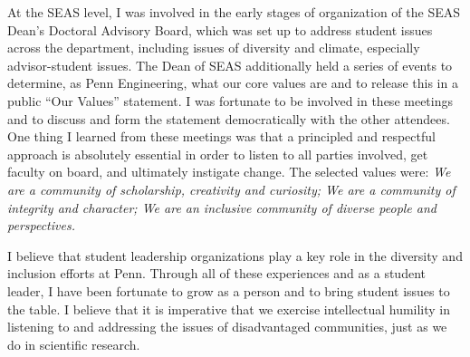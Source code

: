 \documentclass{article}
\begin{document}
At the SEAS level, I was involved in the early stages of organization of the SEAS Dean's Doctoral Advisory Board, which was set up to address student issues across the department, including issues of diversity and climate, especially advisor-student issues.
The Dean of SEAS additionally held a series of events to determine, as Penn Engineering, what our core values are and to release this in a public ``Our Values'' statement. I was fortunate to be involved in these meetings and to discuss and form the statement democratically with the other attendees.
One thing I learned from these meetings was that a principled and respectful approach is absolutely essential in order to listen to all parties involved, get faculty on board, and ultimately instigate change.
The selected values were: \emph{We are a community of scholarship, creativity and curiosity; We are a community of integrity and character; We are an inclusive community of diverse people and perspectives.}

I believe that student leadership organizations play a key role in the diversity and inclusion efforts at Penn.
Through all of these experiences and as a student leader, I have been fortunate to grow as a person and to bring student issues to the table.
I believe that it is imperative that we exercise intellectual humility in listening to and addressing the issues of disadvantaged communities,
just as we do in scientific research.
\end{document}
